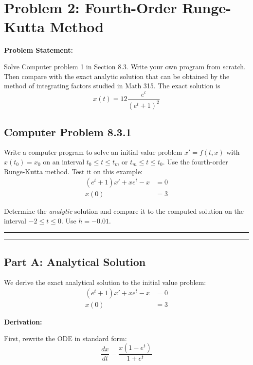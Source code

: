 \clearpage
\section*{Problem 2: Fourth-Order Runge-Kutta Method}

\textbf{Problem Statement:} 

Solve Computer problem 1 in Section 8.3. Write your own program from scratch. Then compare with the exact analytic solution that can be obtained by the method of integrating factors studied in Math 315. The exact solution is
$$x(t) = 12\frac{e^t}{(e^t + 1)^2}$$

\subsection*{Computer Problem 8.3.1}

Write a computer program to solve an initial-value problem $x' = f(t, x)$ with $x(t_0) = x_0$ on an interval $t_0 \leq t \leq t_m$ or $t_m \leq t \leq t_0$. Use the fourth-order Runge-Kutta method. Test it on this example:
\begin{align*}
(e^t + 1)x' + xe^t - x &= 0 \\
x(0) &= 3
\end{align*}

Determine the \textit{analytic} solution and compare it to the computed solution on the interval $-2 \leq t \leq 0$. Use $h = -0.01$.

\noindent\rule{\textwidth}{0.4pt}

\vspace{1em}

\noindent\rule{\textwidth}{0.4pt}

\clearpage
\subsection*{Part A: Analytical Solution}

We derive the exact analytical solution to the initial value problem:
\begin{align*}
(e^t + 1)x' + xe^t - x &= 0 \\
x(0) &= 3
\end{align*}

\textbf{Derivation:}

First, rewrite the ODE in standard form:
$$\frac{dx}{dt} = \frac{x(1-e^t)}{1+e^t}$$

